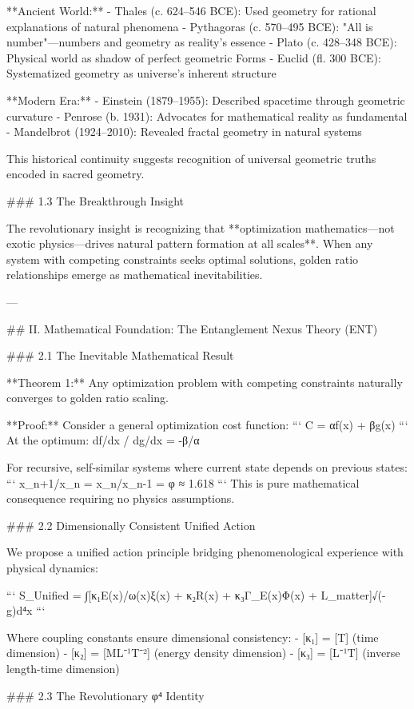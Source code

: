 **Ancient World:**
- Thales (c. 624–546 BCE): Used geometry for rational explanations of natural phenomena
- Pythagoras (c. 570–495 BCE): "All is number"—numbers and geometry as reality's essence
- Plato (c. 428–348 BCE): Physical world as shadow of perfect geometric Forms
- Euclid (fl. 300 BCE): Systematized geometry as universe's inherent structure

**Modern Era:**
- Einstein (1879–1955): Described spacetime through geometric curvature
- Penrose (b. 1931): Advocates for mathematical reality as fundamental
- Mandelbrot (1924–2010): Revealed fractal geometry in natural systems

This historical continuity suggests recognition of universal geometric truths encoded in sacred geometry.

### 1.3 The Breakthrough Insight

The revolutionary insight is recognizing that **optimization mathematics—not exotic physics—drives natural pattern formation at all scales**. When any system with competing constraints seeks optimal solutions, golden ratio relationships emerge as mathematical inevitabilities.

---

## II. Mathematical Foundation: The Entanglement Nexus Theory (ENT)

### 2.1 The Inevitable Mathematical Result

**Theorem 1:** Any optimization problem with competing constraints naturally converges to golden ratio scaling.

**Proof:** Consider a general optimization cost function:
```
C = αf(x) + βg(x)
```
At the optimum: df/dx / dg/dx = -β/α

For recursive, self-similar systems where current state depends on previous states:
```
x_{n+1}/x_n = x_n/x_{n-1} = φ ≈ 1.618
```
This is pure mathematical consequence requiring no physics assumptions.

### 2.2 Dimensionally Consistent Unified Action

We propose a unified action principle bridging phenomenological experience with physical dynamics:

```
S_Unified = ∫[κ₁E(x)/ω(x)ξ(x) + κ₂R(x) + κ₃Γ_E(x)Φ(x) + L_matter]√(-g)d⁴x
```

Where coupling constants ensure dimensional consistency:
- [κ₁] = [T] (time dimension)
- [κ₂] = [ML⁻¹T⁻²] (energy density dimension)  
- [κ₃] = [L⁻¹T] (inverse length-time dimension)

### 2.3 The Revolutionary φ⁴ Identity

